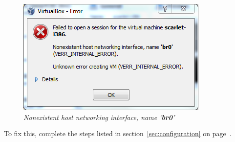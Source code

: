 \documentclass[pdftex,11pt,letterpaper]{article}
\begin{document}
    \begin{figure}[H]
        \begin{center}
        \leavevmode
            \includegraphics[]{scarlet_images/network_error.png}
        \end{center}
        \caption{\emph{Nonexistent host networking interface, name `\textbf{br0}'}}
        \label{fig:network_error}
    \end{figure}
    
To fix this, complete the steps listed in section~\ref{sec:configuration} on page~\pageref{sec:configuration}.
\end{document}

